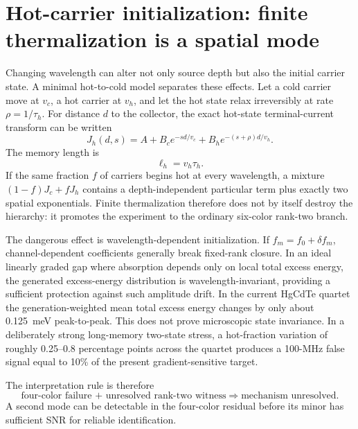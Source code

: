 \documentclass[11pt]{article}
\begin{document}
\section{Hot-carrier initialization: finite thermalization is a spatial mode}
Changing wavelength can alter not only source depth but also the initial carrier state. A minimal hot-to-cold model separates these effects. Let a cold carrier move at $v_c$, a hot carrier at $v_h$, and let the hot state relax irreversibly at rate $\rho=1/\tau_h$. For distance $d$ to the collector, the exact hot-state terminal-current transform can be written
\begin{equation}
\boxed{J_h(d,s)=A+B_c e^{-sd/v_c}+B_h e^{-(s+\rho)d/v_h}.}
\label{eq:hot}
\end{equation}
The memory length is
\begin{equation}
\boxed{\ell_h=v_h\tau_h.}
\end{equation}
If the same fraction $f$ of carriers begins hot at every wavelength, a mixture $(1-f)J_c+fJ_h$ contains a depth-independent particular term plus exactly two spatial exponentials. Finite thermalization therefore does not by itself destroy the hierarchy: it promotes the experiment to the ordinary six-color rank-two branch.

The dangerous effect is wavelength-dependent initialization. If $f_m=f_0+\delta f_m$, channel-dependent coefficients generally break fixed-rank closure. In an ideal linearly graded gap where absorption depends only on local total excess energy, the generated excess-energy distribution is wavelength-invariant, providing a sufficient protection against such amplitude drift. In the current HgCdTe quartet the generation-weighted mean total excess energy changes by only about \SI{0.125}{meV} peak-to-peak. This does not prove microscopic state invariance. In a deliberately strong long-memory two-state stress, a hot-fraction variation of roughly 0.25--0.8 percentage points across the quartet produces a 100-MHz false signal equal to 10\% of the present gradient-sensitive target.

The interpretation rule is therefore
\begin{equation}
\boxed{\text{four-color failure + unresolved rank-two witness}\Rightarrow\text{mechanism unresolved}.}
\end{equation}
A second mode can be detectable in the four-color residual before its minor has sufficient SNR for reliable identification.
\end{document}
